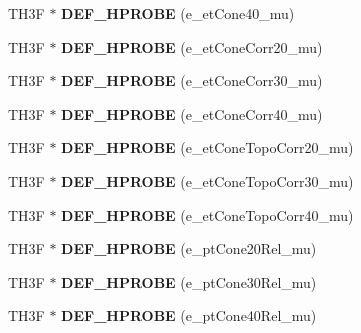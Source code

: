 \begin{DoxyCompactItemize}
\item 
\hypertarget{classHistos__Fake_a597e21ad1867e693cf60e41ba31e81e3}{
TH3F $\ast$ {\bfseries DEF\_\-HPROBE} (e\_\-etCone40\_\-mu)}
\label{classHistos__Fake_a597e21ad1867e693cf60e41ba31e81e3}

\item 
\hypertarget{classHistos__Fake_aaf372f788115a49b622cd518cc85fa93}{
TH3F $\ast$ {\bfseries DEF\_\-HPROBE} (e\_\-etConeCorr20\_\-mu)}
\label{classHistos__Fake_aaf372f788115a49b622cd518cc85fa93}

\item 
\hypertarget{classHistos__Fake_aba2aea6743081d5c810dbb17dfb4089d}{
TH3F $\ast$ {\bfseries DEF\_\-HPROBE} (e\_\-etConeCorr30\_\-mu)}
\label{classHistos__Fake_aba2aea6743081d5c810dbb17dfb4089d}

\item 
\hypertarget{classHistos__Fake_a737489a7502c0314074120cbf87e4bfb}{
TH3F $\ast$ {\bfseries DEF\_\-HPROBE} (e\_\-etConeCorr40\_\-mu)}
\label{classHistos__Fake_a737489a7502c0314074120cbf87e4bfb}

\item 
\hypertarget{classHistos__Fake_a2cba7a4a61bd196140f2f5cdb2aad15d}{
TH3F $\ast$ {\bfseries DEF\_\-HPROBE} (e\_\-etConeTopoCorr20\_\-mu)}
\label{classHistos__Fake_a2cba7a4a61bd196140f2f5cdb2aad15d}

\item 
\hypertarget{classHistos__Fake_a58fefcf378b9415b193540d60a7db05e}{
TH3F $\ast$ {\bfseries DEF\_\-HPROBE} (e\_\-etConeTopoCorr30\_\-mu)}
\label{classHistos__Fake_a58fefcf378b9415b193540d60a7db05e}

\item 
\hypertarget{classHistos__Fake_aa23712372b59fb3108b9828de15cfded}{
TH3F $\ast$ {\bfseries DEF\_\-HPROBE} (e\_\-etConeTopoCorr40\_\-mu)}
\label{classHistos__Fake_aa23712372b59fb3108b9828de15cfded}

\item 
\hypertarget{classHistos__Fake_a6d9a37dc5d6d3c815e4ddac35c4729c2}{
TH3F $\ast$ {\bfseries DEF\_\-HPROBE} (e\_\-ptCone20Rel\_\-mu)}
\label{classHistos__Fake_a6d9a37dc5d6d3c815e4ddac35c4729c2}

\item 
\hypertarget{classHistos__Fake_ae9c841b864df8558c79c76037d5f9442}{
TH3F $\ast$ {\bfseries DEF\_\-HPROBE} (e\_\-ptCone30Rel\_\-mu)}
\label{classHistos__Fake_ae9c841b864df8558c79c76037d5f9442}

\item 
\hypertarget{classHistos__Fake_aeaef8d1bd5406cd9a68ae4297fd10657}{
TH3F $\ast$ {\bfseries DEF\_\-HPROBE} (e\_\-ptCone40Rel\_\-mu)}
\label{classHistos__Fake_aeaef8d1bd5406cd9a68ae4297fd10657}


\end{DoxyCompactItemize}
